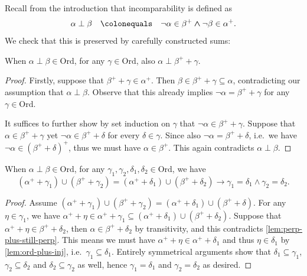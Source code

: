 \documentclass{asl}
\theoremstyle{plain}
\newcommand{\Ord}{\mathrm{Ord}}
\begin{document}
Recall from the introduction that incomparability is defined as
\[\alpha \perp \beta \quad \colonequals \quad \neg \alpha \in \beta^+ \land \neg \beta \in \alpha^+.\]
We check that this is preserved by carefully constructed sums:

\begin{lemma}
  \label{lem:perp-plus-still-perp}
  When $\alpha \perp \beta \in \Ord$, for any $\gamma \in \Ord$, also $\alpha \perp \beta^+ + \gamma$.
\end{lemma}

\begin{proof}
  Firstly, suppose that $\beta^+ + \gamma \in \alpha^+$. Then $\beta \in \beta^+ + \gamma \subseteq \alpha$, contradicting our assumption that $\alpha \perp \beta$. Observe that this already implies $\neg \alpha = \beta^+ + \gamma$ for any $\gamma \in \Ord$.

  It suffices to further show by set induction on $\gamma$ that $\neg \alpha \in \beta^+ + \gamma$. Suppose that $\alpha \in \beta^+ + \gamma$ yet $\neg \alpha \in \beta^+ + \delta$ for every $\delta \in \gamma$. Since also $\neg \alpha = \beta^+ + \delta$, i.e.\ we have $\neg \alpha \in \left(\beta^+ + \delta\right)^+$, thus we must have $\alpha \in \beta^+$. This again contradicts $\alpha \perp \beta$.
\end{proof}

\begin{corollary}
  \label{cor:ord-pair}
  When $\alpha \perp \beta \in \Ord$, for any $\gamma_1, \gamma_2, \delta_1, \delta_2 \in \Ord$, we have
  \[\left(\alpha^+ + \gamma_1\right) \cup \left(\beta^+ + \gamma_2\right) = \left(\alpha^+ + \delta_1\right) \cup \left(\beta^+ + \delta_2\right) \rightarrow \gamma_1 = \delta_1 \land \gamma_2 = \delta_2.\]
\end{corollary}

\begin{proof}
  Assume $\left(\alpha^+ + \gamma_1\right) \cup \left(\beta^+ + \gamma_2\right) = \left(\alpha^+ + \delta_1\right) \cup \left(\beta^+ + \delta\right)$. For any $\eta \in \gamma_1$, we have $\alpha^+ + \eta \in \alpha^+ + \gamma_1 \subseteq \left(\alpha^+ + \delta_1\right) \cup \left(\beta^+ + \delta_2\right)$. Suppose that $\alpha^+ + \eta \in \beta^+ + \delta_2$, then $\alpha \in \beta^+ + \delta_2$ by transitivity, and this contradicts \autoref{lem:perp-plus-still-perp}. This means we must have $\alpha^+ + \eta \in \alpha^+ + \delta_1$ and thus $\eta \in \delta_1$ by \autoref{lem:ord-plus-inj}, i.e.\ $\gamma_1 \subseteq \delta_1$. Entirely symmetrical arguments show that $\delta_1 \subseteq \gamma_1$, $\gamma_2 \subseteq \delta_2$ and $\delta_2 \subseteq \gamma_2$ as well, hence $\gamma_1 = \delta_1$ and $\gamma_2 = \delta_2$ as desired.
\end{proof}
\end{document}
